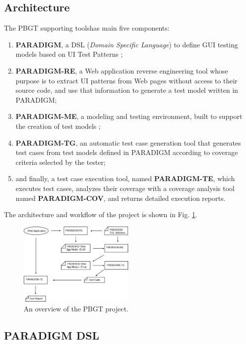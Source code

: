 \documentclass[conference]{IEEEtran}
\begin{document}
\subsection{Architecture}
The PBGT supporting toolshas main five components: 
\begin{enumerate}
\item \textbf{PARADIGM}, a DSL (\textit{Domain Specific Language}) to define GUI testing models based on UI Test Patterns \cite{enase14}; 
\item \textbf{PARADIGM-RE}, a Web application reverse engineering tool whose purpose is to extract UI patterns from Web pages without access to their source code, and use that information to generate a test model written in PARADIGM; 
\item \textbf{PARADIGM-ME}, a modeling and testing environment, built to support the creation of test models \cite{conf_icst_MonteiroP13}; 
\item  \textbf{PARADIGM-TG}, an automatic test case generation tool that generates test cases from test models defined in PARADIGM according to coverage criteria selected by the tester; 
\item and finally, a test case execution tool, named \textbf{PARADIGM-TE}, which executes test cases, analyzes their coverage with a coverage analysis tool named \textbf{PARADIGM-COV}\cite{vilela2014cov}, and returns detailed execution reports. 
\end{enumerate}

The architecture and workflow of the project is shown in Fig. \ref{fig:pbgt}.
\begin{figure}[!htb]
\centering
\includegraphics[width=0.5\textwidth]{pbgt}
\caption{An overview of the PBGT project.}
\label{fig:pbgt}
\end{figure}

\subsection{PARADIGM DSL}\label{sec:dsl}
\end{document}
